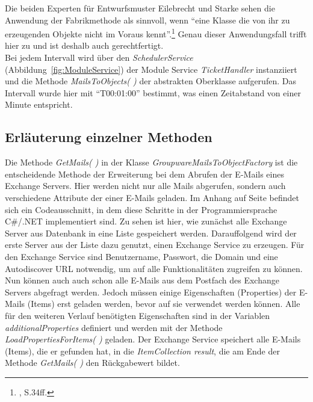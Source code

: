 \noindent
Die beiden Experten für Entwurfsmuster Eilebrecht und Starke sehen die Anwendung der Fabrikmethode als sinnvoll, wenn \enquote{eine Klasse die von ihr zu erzeugenden Objekte nicht im Voraus kennt}.\footnote{\citeauthor{PatternsKompakt} \citeyear{PatternsKompakt}, S.34ff.} Genau dieser Anwendungsfall trifft hier zu und ist deshalb auch gerechtfertigt.\\

\noindent
Bei jedem Intervall wird über den \textit{SchedulerService} (Abbildung~\ref{fig:ModuleService}) der Module Service \textit{TicketHandler} instanziiert und die Methode \textit{MailsToObjects( )} der abstrakten Oberklasse aufgerufen. Das Intervall wurde hier mit \enquote{T00:01:00} bestimmt, was einen Zeitabstand von einer Minute entspricht.




\subsection{Erläuterung einzelner Methoden}
\noindent
Die Methode \textit{GetMails( )} in der Klasse \textit{GroupwareMailsToObjectFactory} ist die entscheidende Methode der Erweiterung bei dem Abrufen der E-Mails eines Exchange Servers. Hier werden nicht nur alle Mails abgerufen, sondern auch verschiedene Attribute der einer E-Mails geladen. Im Anhang auf Seite \pageref{Codeausschnitt} befindet sich ein Codeausschnitt, in dem diese Schritte in der Programmiersprache C\#/.NET implementiert sind. Zu sehen ist hier, wie zunächst alle Exchange Server aus Datenbank in eine Liste gespeichert werden. Darauffolgend wird der erste Server aus der Liste dazu genutzt, einen Exchange Service zu erzeugen. Für den Exchange Service sind Benutzername, Passwort, die Domain und eine Autodiscover URL notwendig, um auf alle Funktionalitäten zugreifen zu können. Nun können auch auch schon alle E-Mails aus dem Postfach des Exchange Servers abgefragt werden. Jedoch müssen einige Eigenschaften (Properties) der E-Mails (Items) erst geladen werden, bevor auf sie verwendet werden können. Alle für den weiteren Verlauf benötigten Eigenschaften sind in der Variablen  \textit{additionalProperties} definiert und werden mit der Methode  \textit{LoadPropertiesForItems( )} geladen. Der Exchange Service speichert alle E-Mails (Items), die er gefunden hat, in die  \textit{ItemCollection result}, die am Ende der Methode  \textit{GetMails( )} den Rückgabewert bildet. 

